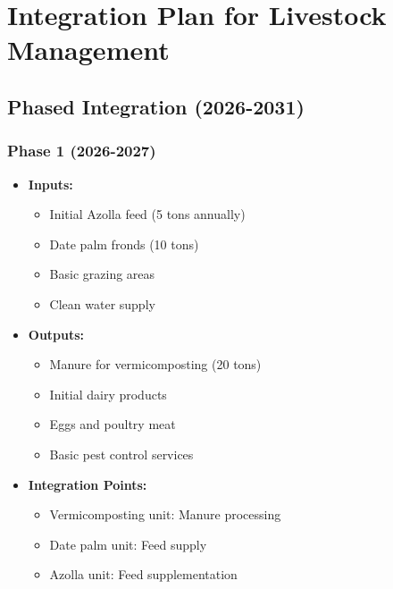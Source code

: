 \section{Integration Plan for Livestock Management}

\subsection{Phased Integration (2026-2031)}

\subsubsection{Phase 1 (2026-2027)}
\begin{itemize}
    \item \textbf{Inputs:}
    \begin{itemize}
        \item Initial Azolla feed (5 tons annually)
        \item Date palm fronds (10 tons)
        \item Basic grazing areas
        \item Clean water supply
    \end{itemize}
    \item \textbf{Outputs:}
    \begin{itemize}
        \item Manure for vermicomposting (20 tons)
        \item Initial dairy products
        \item Eggs and poultry meat
        \item Basic pest control services
    \end{itemize}
    \item \textbf{Integration Points:}
    \begin{itemize}
        \item Vermicomposting unit: Manure processing
        \item Date palm unit: Feed supply
        \item Azolla unit: Feed supplementation
    \end{itemize}
\end{itemize}

